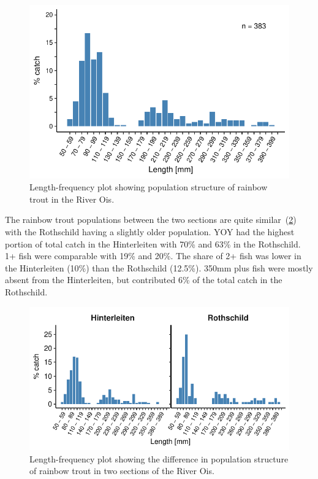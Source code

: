 \begin{figure}[!h]                              %
	\center
	\includegraphics[width=.7\textwidth]{images/rain_single.pdf}     %
	\caption{Length-frequency plot showing population structure of rainbow trout in the River Ois.}        %
	\label{fig:rain_single}           %
\end{figure}

The rainbow trout populations between the two sections are quite similar~(\cref{fig:rain_section}) with the Rothschild having a slightly older population. YOY had the highest portion of total catch in the Hinterleiten with 70\% and 63\% in the Rothschild. 1+ fish were comparable with 19\% and 20\%. The share of 2+ fish was lower in the Hinterleiten (10\%) than the Rothschild (12.5\%). 350mm plus fish were mostly absent from the Hinterleiten, but contributed 6\% of the total catch in the Rothschild.

\begin{figure}[!h]                              %
	\center
	\includegraphics{images/rain_section.pdf}    %
	\caption{Length-frequency plot showing the difference in population structure of rainbow trout in two sections of the River Ois.} %
	\label{fig:rain_section}     %
\end{figure}

